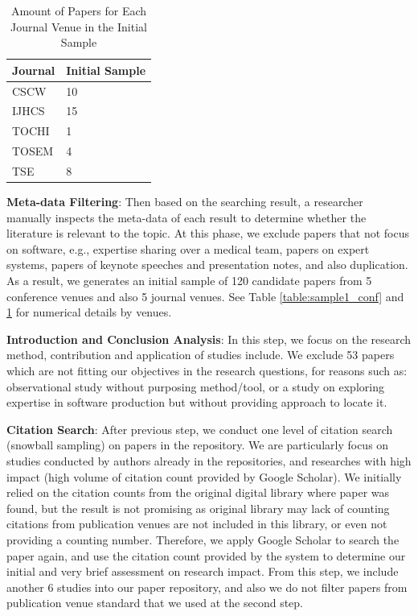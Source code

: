 \begin{table}[tbp]
\centering
\begin{tabular}{ll}
\hline
\textbf{Journal} & \textbf{Initial Sample} \\ \hline
CSCW       & 10             \\ 
IJHCS       & 15             \\ 
TOCHI        & 1             \\ 
TOSEM        & 4             \\ 
TSE        & 8              \\ \hline
\end{tabular}
\caption{Amount of Papers for Each Journal Venue in the Initial Sample}
\label{table:sample1_jour}
\end{table}

\textbf{Meta-data Filtering}: Then based on the searching result, a researcher manually inspects the meta-data of each result to determine whether the literature is relevant to the topic. At this phase, we exclude papers that not focus on software, e.g., expertise sharing over a medical team, papers on expert systems, papers of keynote speeches and presentation notes, and also duplication. As a result, we generates an initial sample of 120 candidate papers from 5 conference venues and also 5 journal venues. See Table \ref{table:sample1_conf} and \ref{table:sample1_jour} for numerical details by venues.

\textbf{Introduction and Conclusion Analysis}: In this step, we focus on the research method, contribution and application of studies include. We exclude 53 papers which are not fitting our objectives in the research questions, for reasons such as: observational study without purposing method/tool, or a study on exploring expertise in software production but without providing approach to locate it.

\textbf{Citation Search}: After previous step, we conduct one level of citation search (snowball sampling) on papers in the repository. We are particularly focus on studies conducted by authors already in the repositories, and researches with high impact (high volume of citation count provided by Google Scholar). We initially relied on the citation counts from the original digital library where paper was found, but the result is not promising as original library may lack of counting citations from publication venues are not included in this library, or even not providing a counting number. Therefore, we apply Google Scholar to search the paper again, and use the citation count provided by the system to determine our initial and very brief assessment on research impact. From this step, we include another 6 studies into our paper repository, and also we do not filter papers from publication venue standard that we used at the second step.

